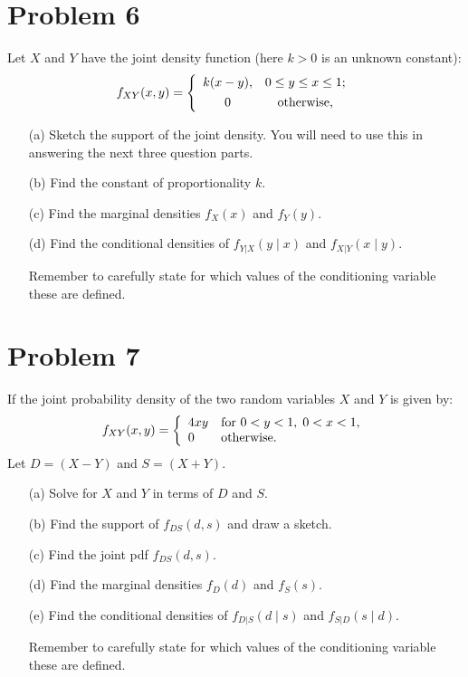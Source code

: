 \documentclass{article}
\newcommand{\1}{\mathbf{1}}
\begin{document}
\newpage
\section*{Problem 6}  Let $X$ and $Y$ have the joint density function (here $k>0$ is an unknown constant):
\[
f_{XY}(x,y) = \left\{\begin{array}{cc}
k(x-y), & 0\leq y\leq x \leq 1;\\[4pt]
0 & \hbox{otherwise,}
\end{array}
\right.
\]

\begin{itemize}
\item[(a)] Sketch the support of the joint density. You will need to use this in answering the next three question parts.
\item[(b)] Find the constant of proportionality $k$.
\item[(c)] Find the marginal densities $f_X(x)$ and $f_Y(y)$.
\item[(d)] Find the conditional densities of $f_{Y|X}(y\mid x)$ and $f_{X|Y}(x\mid y)$.\par
 Remember to carefully state for which values of the conditioning variable these are defined.
\end{itemize}

\eject




\newpage
\section*{Problem 7} 
If the joint probability density of the two random variables $X$ and $Y$ is given by:
\[
f_{XY}(x,y) =\left\{\begin{array}{ll}
4xy & \hbox{for } 0 < y<1,\; 0<x <1,\\
0 & \hbox{otherwise.}
\end{array}
\right.
\]
Let $D=(X-Y)$ and $S=(X+Y)$.  
\begin{itemize}
\item[(a)] Solve for $X$  and $Y$ in terms of $D$ and $S$.

\item [(b)] Find the support of $f_{DS}(d,s)$ and draw a sketch.

\item[(c)] Find the joint pdf $f_{DS}(d,s)$.

\item[(d)] Find the marginal densities $f_D(d)$ and $f_S(s)$.

\item[(e)] Find the conditional densities of $f_{D|S}(d\mid s)$ and $f_{S|D}(s\mid d)$.\par

 Remember to carefully state for which values of the conditioning variable these are defined.
\end{itemize}
\end{document}
